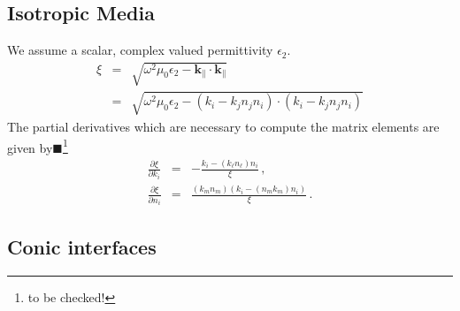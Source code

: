 \documentclass[12pt,a4paper,twoside,openright,BCOR10mm,headsepline,titlepage,abstracton,chapterprefix,final]{scrreprt}
\newcommand\Vector[1]{{\mathbf{#1}}}
\newcommand\vacuum{0}
\newcommand\wavenumber{k}
\newcommand\Wavevector{\Vector{\wavenumber}}
\newcommand\vacuumpermeability{\mu_{\vacuum}}
\newcommand\scalarpermittivity{\epsilon}
\newcommand{\remark}[1]{{\color{red}$\blacksquare$}\footnote{{\color{red}#1}}}
\begin{document}
\subsection{Isotropic Media}
We assume a scalar, complex valued permittivity $\scalarpermittivity_2$.
\begin{eqnarray}
 \xi &=& \sqrt{\omega^2 \vacuumpermeability \scalarpermittivity_2 - \Wavevector_{\parallel} \cdot \Wavevector_{\parallel}} \nonumber\\
      &=& \sqrt{\omega^2 \vacuumpermeability \scalarpermittivity_2 - (\wavenumber_i - \wavenumber_j n_j n_i) \cdot (\wavenumber_i - \wavenumber_j n_j n_i)}
\end{eqnarray}
The partial derivatives which are necessary to compute the matrix elements are given by\remark{to be checked!}
\begin{eqnarray}
 \frac{\partial \xi}{\partial k_i} &=& -\frac{k_i - (k_\ell n_\ell) n_i}{\xi}\,,\\
 \frac{\partial \xi}{\partial n_i} &=& \frac{(k_m n_m) (k_i - (n_m k_m) n_i)}{\xi}\,.
\end{eqnarray}


\subsection{Conic interfaces}
\end{document}
